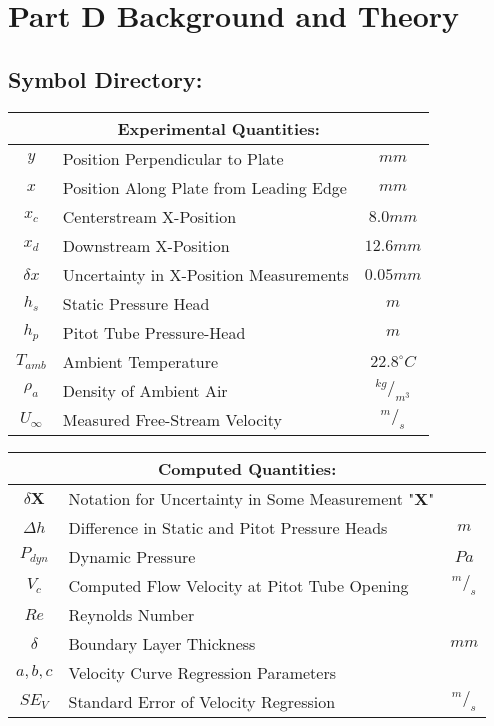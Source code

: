 \documentclass[12pt]{article}
\begin{document}
	\section{Part D Background and Theory}
	\hfill\break\break
	\subsection{Symbol Directory:}
	{
	\centering
	\begin{tabular}{|c|l|c|}
		\hline
		\multicolumn{3}{|c|}{\textbf{Experimental Quantities:}} \\
		\hline
		\hline
		$y$ & Position Perpendicular to Plate & $mm$ \\
		$x$ & Position Along Plate from Leading Edge & $mm$ \\
		$x_c$ & Centerstream X-Position & $8.0mm$ \\
		$x_d$ & Downstream X-Position & $12.6mm$ \\
		$\delta x$ & Uncertainty in X-Position Measurements & $0.05mm$ \\
		$h_s$ & Static Pressure Head & $m$\\
		$h_p$ & Pitot Tube Pressure-Head & $m$\\
		$T_{amb}$ & Ambient Temperature & $22.8^{\circ}C$\\
		$\rho_a$ & Density of Ambient Air & $^{kg}/_{m^3}$ \\
		$U_{\infty}$ & Measured Free-Stream Velocity & $^m/_s$ \\
		\hline
	\end{tabular}
	}
	\hfill\break\break\break
	{
	\centering
	\begin{tabular}{|c|l|c|}
		\hline
		\multicolumn{3}{|c|}{\textbf{Computed Quantities:}} \\
		\hline
		\hline
		$\delta \textbf{X}$ & Notation for Uncertainty in Some Measurement "\textbf{X}" & ${}$\\
		$\Delta h$ & Difference in Static and Pitot Pressure Heads & $m$\\
		$P_{dyn}$ & Dynamic Pressure & $Pa$\\
		$V_c$ & Computed Flow Velocity at Pitot Tube Opening & $^m/_s$\\
		$Re$ & Reynolds Number & ${}$ \\
		$\delta$ & Boundary Layer Thickness & $mm$ \\
		$a,b,c$ & Velocity Curve Regression Parameters & ${}$ \\
		$SE_V$ & Standard Error of Velocity Regression & ${^m/_s}$ \\
		\hline
	\end{tabular}
	}
\end{document}
